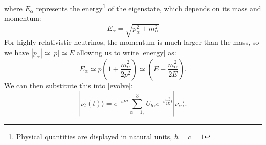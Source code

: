 where $E_\alpha$ represents the energy\footnote{Physical quantities are
displayed in natural units, $\hbar = c = 1$}
of the eigenstate, which depends on its mass and momentum:
\begin{equation}\label{energy}
E_\alpha = \sqrt{p_\alpha^2 + m_\alpha^2}
\end{equation}
For highly relativistic neutrinos, the momentum is much larger than the mass,
so we have
$|p_\alpha| \simeq |p| \simeq E$ allowing us to write \eqref{energy} as:
\begin{equation}\label{energyApprox}
E_\alpha \simeq p(1+\frac{m_\alpha^2}{2p^2})\simeq (E+\frac{m_\alpha^2}{2E}).
\end{equation}
We can then substitute this into \eqref{evolve}:
\begin{equation}\label{evolveSub}
|\nu_l(t) \rangle = e^{-iEt} \sum_{\alpha = 1,}^3 U_{l\alpha}e^{-i\frac{m_\alpha^2}{2E} t}|\nu_\alpha\rangle.
\end{equation}

